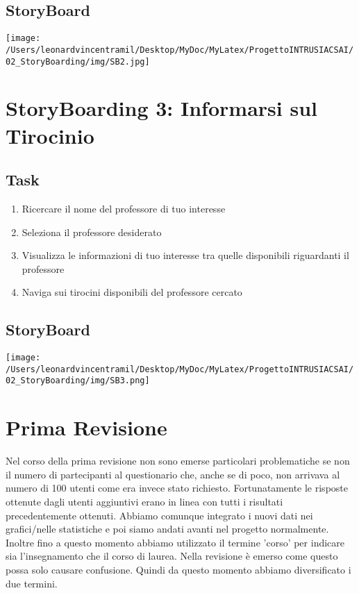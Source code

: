\subsection{StoryBoard}
\begin{center}
    \texttt{[image: /Users/leonardvincentramil/Desktop/MyDoc/MyLatex/ProgettoINTRUSIACSAI/02\_StoryBoarding/img/SB2.jpg]}
\end{center}


\section{StoryBoarding 3: Informarsi sul Tirocinio}

\subsection{Task}
\begin{enumerate}
    \item Ricercare il nome del professore di tuo interesse
    \item Seleziona il professore desiderato
    \item Visualizza le informazioni di tuo interesse tra quelle disponibili riguardanti il professore
    \item Naviga sui tirocini disponibili del professore cercato
\end{enumerate} 

\subsection{StoryBoard}
\begin{center}
    \texttt{[image: /Users/leonardvincentramil/Desktop/MyDoc/MyLatex/ProgettoINTRUSIACSAI/02\_StoryBoarding/img/SB3.png]}
\end{center}

\section{Prima Revisione}
Nel corso della prima revisione non sono emerse particolari problematiche se non il numero di partecipanti al questionario che, anche se di poco, non arrivava al numero di 100 utenti come era invece stato richiesto. Fortunatamente le risposte ottenute dagli utenti aggiuntivi erano in linea con tutti i risultati precedentemente ottenuti. Abbiamo comunque integrato i nuovi dati nei grafici/nelle statistiche e poi siamo andati avanti nel progetto normalmente.
Inoltre fino a questo momento abbiamo utilizzato il termine 'corso' per indicare sia l'insegnamento che il corso di laurea. Nella revisione è emerso come questo possa solo causare confusione. Quindi da questo momento abbiamo diversificato i due termini.